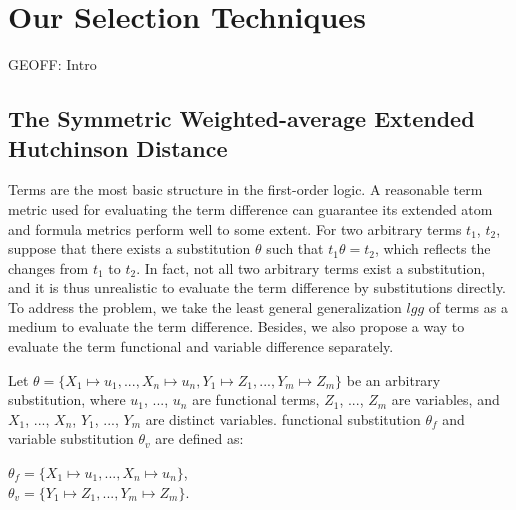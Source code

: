\documentclass[EPiC]{easychair}
\begin{document}
\section{Our Selection Techniques}
\label{Ours}

GEOFF:
Intro
\subsection{The Symmetric Weighted-average Extended Hutchinson Distance}
\label{QinghuaDistance}

Terms are the most basic structure in the first-order logic. 
A reasonable term metric used for evaluating the term difference can guarantee 
its extended atom and formula metrics perform well to some extent. 
For two arbitrary terms $t_1$, $t_2$, suppose that there exists a substitution 
$\theta$ such that $t_1\theta=t_2$, which reflects the changes from 
$t_1$ to $t_2$. 
In fact, not all two arbitrary terms exist a substitution, and it is thus 
unrealistic to evaluate the term difference by substitutions directly. 
To address the problem, we take the least general generalization $lgg$ of 
terms as a medium to evaluate the term difference. 
Besides, we also propose a way to evaluate the term functional and variable 
difference separately.

Let 
$\theta=\{X_1\mapsto u_1, ..., X_n\mapsto u_n, Y_1\mapsto Z_1, ..., Y_m\mapsto Z_m\}$ 
be an arbitrary substitution, where $u_1$, ..., $u_n$ are functional terms, 
$Z_1$, ..., $Z_m$ are variables, and $X_1$, ..., $X_n$, $Y_1$, ..., $Y_m$ 
are distinct variables. 
functional substitution $\theta_f$ and variable substitution $\theta_v$ are 
defined as:
	\begin{center}
		$\theta_{f}=\{X_1\mapsto u_1, ..., X_n\mapsto u_n\}$, \\
		$\theta_{v}=\{Y_1\mapsto Z_1, ..., Y_m\mapsto Z_m\}$.
	\end{center}
	
\end{document}
